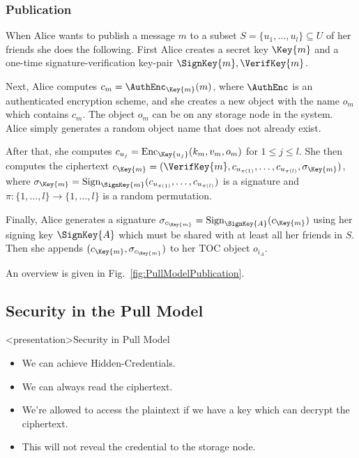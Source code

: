 \subsubsection<article>{Publication}

When Alice wants to publish a message \(m\) to a subset \(S = \{u_1, \ldots, 
  u_l\}\subseteq U\) of her friends she does the following.
First Alice creates a secret key \(\Key{m}\) and a one-time 
signature-verification key-pair \(\SignKey{m}, \VerifKey{m}\).

Next, Alice computes \(c_m = \AuthEnc_{\Key{m}}( m )\), where \(\AuthEnc\) is 
an authenticated encryption scheme, and she creates a new object with the name 
\(o_m\) which contains \(c_m\).
The object \(o_m\) can be on any storage node in the system.
Alice simply generates a random object name that does not already exist.

After that, she computes \(c_{u_j} = \Enc_{\Key{u_j}}( k_m, v_m, o_m )\) for 
\(1\leq j\leq l\).
She then computes the ciphertext \(c_{\Key{m}} = (\VerifKey{m}, c_{u_{\pi(1)}}, 
  \ldots, c_{u_{\pi(l)}}, \sigma_{\Key{m}})\), where \(\sigma_{\Key{m}} 
  = \Sign_{\SignKey{m}}( c_{u_{\pi(1)}}, \ldots, c_{u_{\pi(l)}} )\) is 
a signature and \(\pi\colon \{1,\ldots,l\}\to \{1,\ldots,l\}\) is a random 
permutation.

Finally, Alice generates a signature \(\sigma_{c_{\Key{m}}} 
  = \Sign_{\SignKey{A}}( c_{\Key{m}} )\) using her signing key \(\SignKey{A}\) 
which must be shared with at least all her friends in \(S\).
Then she appends \((c_{\Key{m}}, \sigma_{c_{\Key{m}}})\) to her \ac{TOC} object 
\(o_{i_A}\).

An overview is given in Fig.~\ref{fig:PullModelPublication}.

\subsection<article>{Security in the Pull Model}\label{sec:PullModelSec}

\begin{frame}<presentation>{Security in Pull Model}
  \begin{itemize}

    \item We can achieve Hidden-Credentials.

    \item We can always read the ciphertext.

    \item We're allowed to access the plaintext if we have a key which can 
      decrypt the ciphertext.

    \item This will not reveal the credential to the storage node.

  \end{itemize}
\end{frame}

